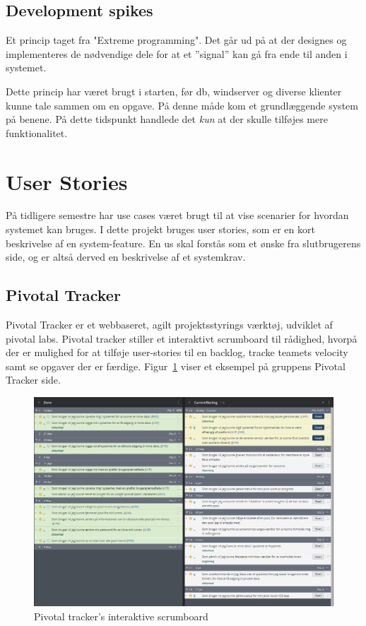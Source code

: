 \subsection{Development spikes}
Et princip taget fra "Extreme programming". Det går ud på at der designes og implementeres de nødvendige dele for at et ''signal'' kan gå fra ende til anden i systemet.

Dette princip har været brugt i starten, før \gls{db}, \gls{windserver} og diverse klienter kunne tale sammen om en opgave. På denne måde kom et grundlæggende system på benene. På dette tidspunkt handlede det \textit{kun} at der skulle tilføjes mere funktionalitet.

\section{User Stories}
På tidligere semestre har use cases været brugt til at vise scenarier for hvordan systemet kan bruges. I dette projekt bruges user stories\cite{margaretrouse2015}, som er en kort beskrivelse af en system-feature. En \gls{us} skal forstås som et ønske fra slutbrugerens side, og er altså derved en beskrivelse af et systemkrav.

\subsection{Pivotal Tracker}
Pivotal Tracker er et webbaseret, agilt projektsstyrings værktøj, udviklet af pivotal labs. Pivotal tracker stiller et interaktivt scrumboard til rådighed, hvorpå der er mulighed for at tilføje user-stories til en backlog, tracke teamets velocity samt se opgaver der er færdige. Figur~\ref{fig:scrumboard} viser et eksempel på gruppens Pivotal Tracker side.

\begin{figure}
	\centering
	\includegraphics[width=\linewidth]{figs/processProjektGennemforsel/scrumboard.PNG}
	\caption{Pivotal tracker's interaktive scrumboard}
	\label{fig:scrumboard}
\end{figure}

